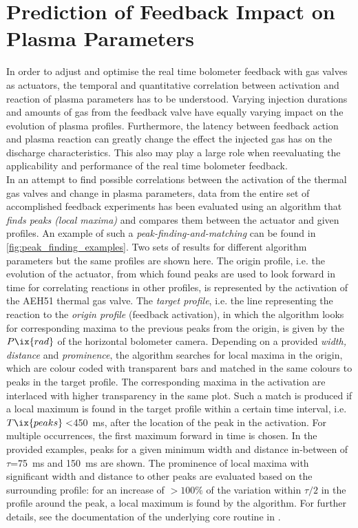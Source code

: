 \chapter{Prediction of Feedback Impact on Plasma Parameters}\label{apx:peaktopeak}%
%
    In order to adjust and optimise the real time bolometer feedback with gas valves as actuators, the temporal and quantitative correlation between activation and reaction of plasma parameters has to be understood. Varying injection durations and amounts of gas from the feedback valve have equally varying impact on the evolution of plasma profiles. Furthermore, the latency between feedback action and plasma reaction can greatly change the effect the injected gas has on the discharge characteristics. This also may play a large role when reevaluating the applicability and performance of the real time bolometer feedback.\\%
    In an attempt to find possible correlations between the activation of the thermal gas valves and change in plasma parameters, data from the entire set of accomplished feedback experiments has been evaluated using an algorithm that \textit{finds peaks (local maxima)} and compares them between the actuator and given profiles. An example of such a \textit{peak-finding-and-matching} can be found in \cref{fig:peak_finding_examples}. Two sets of results for different algorithm parameters but the same profiles are shown here. The origin profile, i.e. the evolution of the actuator, from which found peaks are used to look forward in time for correlating reactions in other profiles, is represented by the activation of the AEH51 thermal gas valve. The \textit{target profile}, i.e. the line representing the reaction to the \textit{origin profile} (feedback activation), in which the algorithm looks for corresponding maxima to the previous peaks from the origin, is given by the $P\ix{rad}$ of the horizontal bolometer camera. Depending on a provided \textit{width, distance} and \textit{prominence}, the algorithm searches for local maxima in the origin, which are colour coded with transparent bars and matched in the same colours to peaks in the target profile. The corresponding maxima in the activation are interlaced with higher transparency in the same plot. Such a match is produced if a local maximum is found in the target profile within a certain time interval, i.e. $T\ix{peaks}<$\SI{450}{\milli\second}, after the location of the peak in the activation. For multiple occurrences, the first maximum forward in time is chosen. In the provided examples, peaks for a given minimum width and distance in-between of $\tau$=\SI{75}{\milli\second} and \SI{150}{\milli\second} are shown. The prominence of local maxima with significant width and distance to other peaks are evaluated based on the surrounding profile: for an increase of $>100\%$ of the variation within $\tau/2$ in the profile around the peak, a local maximum is found by the algorithm. For further details, see the documentation of the underlying core routine in \cite{ScipyFindPeaks}.\\%
